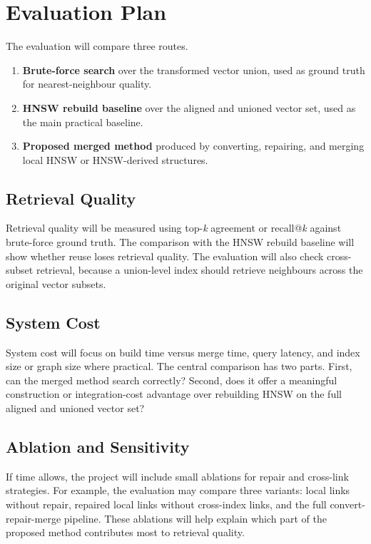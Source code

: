 \documentclass[11pt]{article}
\begin{document}
\section{Evaluation Plan}

The evaluation will compare three routes.

\begin{enumerate}
\item \textbf{Brute-force search} over the transformed vector union, used as ground truth for nearest-neighbour quality.
\item \textbf{HNSW rebuild baseline} over the aligned and unioned vector set, used as the main practical baseline.
\item \textbf{Proposed merged method} produced by converting, repairing, and merging local HNSW or HNSW-derived structures.
\end{enumerate}

\subsection{Retrieval Quality}

Retrieval quality will be measured using top-\textit{k} agreement or recall@\textit{k} against brute-force ground truth. The comparison with the HNSW rebuild baseline will show whether reuse loses retrieval quality. The evaluation will also check cross-subset retrieval, because a union-level index should retrieve neighbours across the original vector subsets.

\subsection{System Cost}

System cost will focus on build time versus merge time, query latency, and index size or graph size where practical. The central comparison has two parts. First, can the merged method search correctly? Second, does it offer a meaningful construction or integration-cost advantage over rebuilding HNSW on the full aligned and unioned vector set?

\subsection{Ablation and Sensitivity}

If time allows, the project will include small ablations for repair and cross-link strategies. For example, the evaluation may compare three variants: local links without repair, repaired local links without cross-index links, and the full convert-repair-merge pipeline. These ablations will help explain which part of the proposed method contributes most to retrieval quality.
\end{document}
